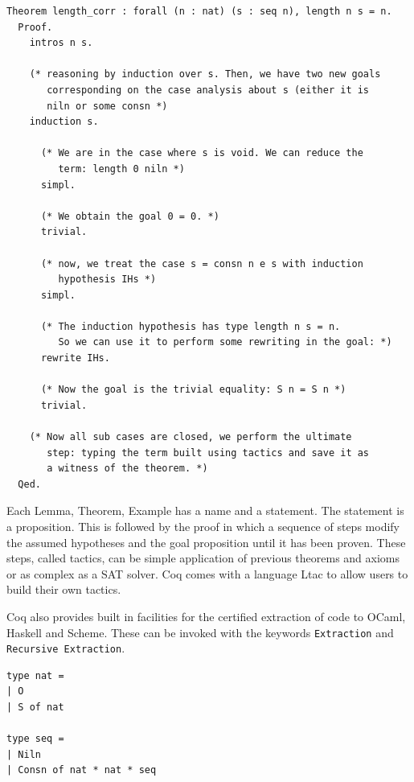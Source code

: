 \documentclass[12pt,twoside,notitlepage]{report}
\theoremstyle{plain}%
\theoremstyle{definition}
\theoremstyle{remark}
\begin{document}
\begin{minipage}{\linewidth}

\begin{lstlisting}[language={Coq},caption={Coq theorem example}]
Theorem length_corr : forall (n : nat) (s : seq n), length n s = n.
  Proof.
    intros n s.

    (* reasoning by induction over s. Then, we have two new goals
       corresponding on the case analysis about s (either it is 
       niln or some consn *)
    induction s.

      (* We are in the case where s is void. We can reduce the 
         term: length 0 niln *)
      simpl. 

      (* We obtain the goal 0 = 0. *)
      trivial.

      (* now, we treat the case s = consn n e s with induction 
         hypothesis IHs *)
      simpl. 

      (* The induction hypothesis has type length n s = n. 
         So we can use it to perform some rewriting in the goal: *)
      rewrite IHs. 

      (* Now the goal is the trivial equality: S n = S n *)
      trivial.

    (* Now all sub cases are closed, we perform the ultimate
       step: typing the term built using tactics and save it as
       a witness of the theorem. *)
  Qed.	  
\end{lstlisting}

\end{minipage}
Each Lemma, Theorem, Example has a name and a statement. The statement is a proposition. This is followed by the proof in which a sequence of steps modify the assumed hypotheses and the goal proposition until it has been proven. These steps, called tactics, can be simple application of previous theorems and axioms or as complex as a SAT solver. Coq comes with a language Ltac to allow users to build their own tactics.


Coq also provides built in facilities for the certified extraction of code to OCaml, Haskell and Scheme. These can be invoked with the keywords \lstinline[language={Coq}]|Extraction| and \lstinline[language={Coq}]|Recursive Extraction|. 
\vspace{3mm}

\begin{minipage}{\linewidth}

\begin{lstlisting}[caption={Coq to OCaml extraction of seq}]
type nat =
| O
| S of nat

type seq =
| Niln
| Consn of nat * nat * seq
\end{lstlisting}

\end{minipage}
\end{document}
